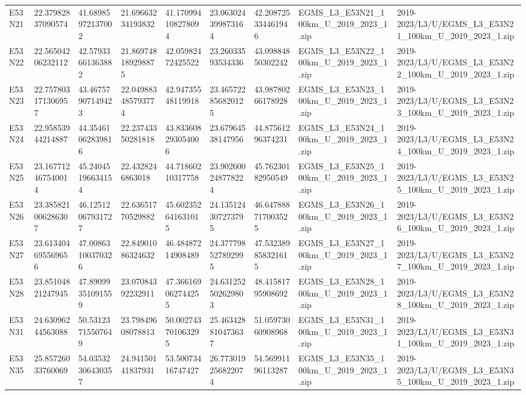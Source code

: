 \begin{landscape}
\begin{longtable}{lllllllll}
E53N21 & 22.37982837090574 & 41.68985972137002 & 21.69663234193832 & 41.170994108278094 & 23.063024399873164 & 42.208725334461946 & EGMS\_L3\_E53N21\_100km\_U\_2019\_2023\_1.zip & 2019-2023/L3/U/EGMS\_L3\_E53N21\_100km\_U\_2019\_2023\_1.zip \\
E53N22 & 22.56504206232112 & 42.57933661363882 & 21.869748189298875 & 42.05982472425522 & 23.26033593534336 & 43.09884850302242 & EGMS\_L3\_E53N22\_100km\_U\_2019\_2023\_1.zip & 2019-2023/L3/U/EGMS\_L3\_E53N22\_100km\_U\_2019\_2023\_1.zip \\
E53N23 & 22.757803171306957 & 43.46757907149423 & 22.049883485793774 & 42.94735548119918 & 23.465722856820125 & 43.98780266178928 & EGMS\_L3\_E53N23\_100km\_U\_2019\_2023\_1.zip & 2019-2023/L3/U/EGMS\_L3\_E53N23\_100km\_U\_2019\_2023\_1.zip \\
E53N24 & 22.95853944214887 & 44.35461062839816 & 22.23743350281818 & 43.833608293054006 & 23.67964538147956 & 44.87561296374231 & EGMS\_L3\_E53N24\_100km\_U\_2019\_2023\_1.zip & 2019-2023/L3/U/EGMS\_L3\_E53N24\_100km\_U\_2019\_2023\_1.zip \\
E53N25 & 23.167712467540014 & 45.24045196634154 & 22.4328246863018 & 44.71860210317758 & 23.902600248778224 & 45.76230182950549 & EGMS\_L3\_E53N25\_100km\_U\_2019\_2023\_1.zip & 2019-2023/L3/U/EGMS\_L3\_E53N25\_100km\_U\_2019\_2023\_1.zip \\
E53N26 & 23.385821006286307 & 46.12512067931727 & 22.63651770529882 & 45.602352641631015 & 24.135124307273795 & 46.647888717003525 & EGMS\_L3\_E53N26\_100km\_U\_2019\_2023\_1.zip & 2019-2023/L3/U/EGMS\_L3\_E53N26\_100km\_U\_2019\_2023\_1.zip \\
E53N27 & 23.613404695569656 & 47.00863100370326 & 22.84901086324632 & 46.48487214908489 & 24.377798527892995 & 47.532389858321615 & EGMS\_L3\_E53N27\_100km\_U\_2019\_2023\_1.zip & 2019-2023/L3/U/EGMS\_L3\_E53N27\_100km\_U\_2019\_2023\_1.zip \\
E53N28 & 23.85104821247945 & 47.89099351091559 & 23.07084392232911 & 47.366169062744255 & 24.631252502629803 & 48.41581795908692 & EGMS\_L3\_E53N28\_100km\_U\_2019\_2023\_1.zip & 2019-2023/L3/U/EGMS\_L3\_E53N28\_100km\_U\_2019\_2023\_1.zip \\
E53N31 & 24.63096244563088 & 50.53123715507649 & 23.79849608078813 & 50.002743701063295 & 25.463428810473637 & 51.05973060908968 & EGMS\_L3\_E53N31\_100km\_U\_2019\_2023\_1.zip & 2019-2023/L3/U/EGMS\_L3\_E53N31\_100km\_U\_2019\_2023\_1.zip \\
E53N35 & 25.85726033760069 & 54.03532306430357 & 24.94150141837931 & 53.50073416747427 & 26.773019256822074 & 54.56991196113287 & EGMS\_L3\_E53N35\_100km\_U\_2019\_2023\_1.zip & 2019-2023/L3/U/EGMS\_L3\_E53N35\_100km\_U\_2019\_2023\_1.zip \\

\end{longtable}
\end{landscape}
